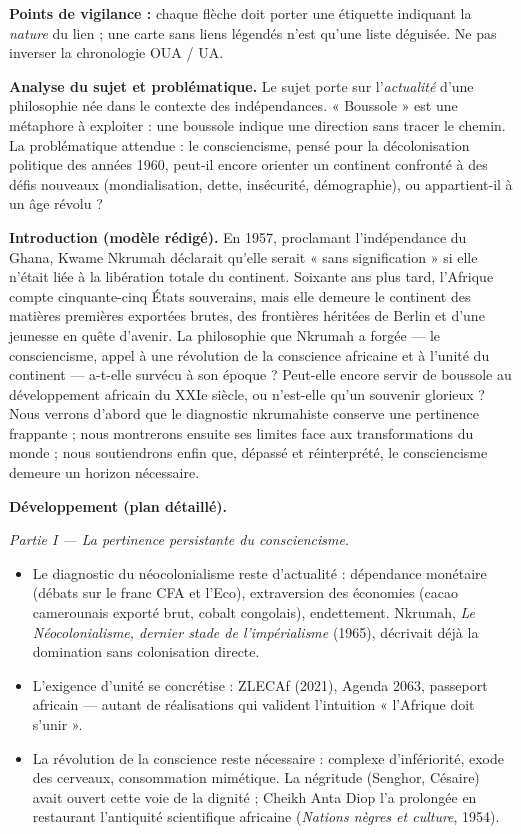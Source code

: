 \documentclass[11pt]{article}
\begin{document}
\begin{corrige}
\textbf{Points de vigilance :} chaque flèche doit porter une étiquette indiquant la \emph{nature} du lien ; une carte sans liens légendés n'est qu'une liste déguisée. Ne pas inverser la chronologie OUA / UA.
\end{corrige}

\begin{corrige}

\textbf{Analyse du sujet et problématique.} Le sujet porte sur l'\emph{actualité} d'une philosophie née dans le contexte des indépendances. « Boussole » est une métaphore à exploiter : une boussole indique une direction sans tracer le chemin. La problématique attendue : le consciencisme, pensé pour la décolonisation politique des années 1960, peut-il encore orienter un continent confronté à des défis nouveaux (mondialisation, dette, insécurité, démographie), ou appartient-il à un âge révolu ?

\textbf{Introduction (modèle rédigé).} En 1957, proclamant l'indépendance du Ghana, Kwame Nkrumah déclarait qu'elle serait « sans signification » si elle n'était liée à la libération totale du continent. Soixante ans plus tard, l'Afrique compte cinquante-cinq États souverains, mais elle demeure le continent des matières premières exportées brutes, des frontières héritées de Berlin et d'une jeunesse en quête d'avenir. La philosophie que Nkrumah a forgée — le consciencisme, appel à une révolution de la conscience africaine et à l'unité du continent — a-t-elle survécu à son époque ? Peut-elle encore servir de boussole au développement africain du XXIe siècle, ou n'est-elle qu'un souvenir glorieux ? Nous verrons d'abord que le diagnostic nkrumahiste conserve une pertinence frappante ; nous montrerons ensuite ses limites face aux transformations du monde ; nous soutiendrons enfin que, dépassé et réinterprété, le consciencisme demeure un horizon nécessaire.

\textbf{Développement (plan détaillé).}

\emph{Partie I — La pertinence persistante du consciencisme.}
\begin{itemize}
\item Le diagnostic du néocolonialisme reste d'actualité : dépendance monétaire (débats sur le franc CFA et l'Eco), extraversion des économies (cacao camerounais exporté brut, cobalt congolais), endettement. Nkrumah, \emph{Le Néocolonialisme, dernier stade de l'impérialisme} (1965), décrivait déjà la domination sans colonisation directe.
\item L'exigence d'unité se concrétise : ZLECAf (2021), Agenda 2063, passeport africain — autant de réalisations qui valident l'intuition « l'Afrique doit s'unir ».
\item La révolution de la conscience reste nécessaire : complexe d'infériorité, exode des cerveaux, consommation mimétique. La négritude (Senghor, Césaire) avait ouvert cette voie de la dignité ; Cheikh Anta Diop l'a prolongée en restaurant l'antiquité scientifique africaine (\emph{Nations nègres et culture}, 1954).
\end{itemize}


\end{corrige}
\end{document}

